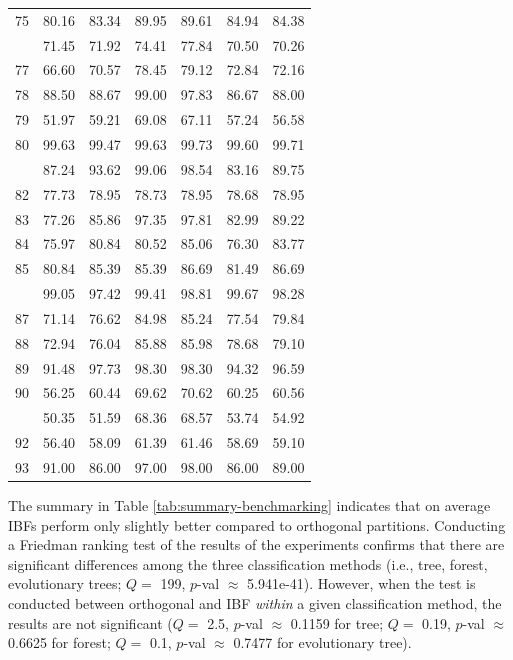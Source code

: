 \documentclass[]{elsarticle} %
\begin{document}
\begin{longtable}[t]{rrrrrrr}
75 & 80.16 & 83.34 & 89.95 & 89.61 & 84.94 & 84.38\\
\addlinespace
76 & 71.45 & 71.92 & 74.41 & 77.84 & 70.50 & 70.26\\
77 & 66.60 & 70.57 & 78.45 & 79.12 & 72.84 & 72.16\\
78 & 88.50 & 88.67 & 99.00 & 97.83 & 86.67 & 88.00\\
79 & 51.97 & 59.21 & 69.08 & 67.11 & 57.24 & 56.58\\
80 & 99.63 & 99.47 & 99.63 & 99.73 & 99.60 & 99.71\\
\addlinespace
81 & 87.24 & 93.62 & 99.06 & 98.54 & 83.16 & 89.75\\
82 & 77.73 & 78.95 & 78.73 & 78.95 & 78.68 & 78.95\\
83 & 77.26 & 85.86 & 97.35 & 97.81 & 82.99 & 89.22\\
84 & 75.97 & 80.84 & 80.52 & 85.06 & 76.30 & 83.77\\
85 & 80.84 & 85.39 & 85.39 & 86.69 & 81.49 & 86.69\\
\addlinespace
86 & 99.05 & 97.42 & 99.41 & 98.81 & 99.67 & 98.28\\
87 & 71.14 & 76.62 & 84.98 & 85.24 & 77.54 & 79.84\\
88 & 72.94 & 76.04 & 85.88 & 85.98 & 78.68 & 79.10\\
89 & 91.48 & 97.73 & 98.30 & 98.30 & 94.32 & 96.59\\
90 & 56.25 & 60.44 & 69.62 & 70.62 & 60.25 & 60.56\\
\addlinespace
91 & 50.35 & 51.59 & 68.36 & 68.57 & 53.74 & 54.92\\
92 & 56.40 & 58.09 & 61.39 & 61.46 & 58.69 & 59.10\\
93 & 91.00 & 86.00 & 97.00 & 98.00 & 86.00 & 89.00\\*
\end{longtable}

The summary in Table \ref{tab:summary-benchmarking} indicates that on
average IBFs perform only slightly better compared to orthogonal
partitions. Conducting a Friedman ranking test of the results of the
experiments confirms that there are significant differences among the
three classification methods (i.e., tree, forest, evolutionary trees;
\(Q =\) 199, \(p\)-val \(\approx\) 5.941e-41). However, when the test is
conducted between orthogonal and IBF \emph{within} a given
classification method, the results are not significant (\(Q =\) 2.5,
\(p\)-val \(\approx\) 0.1159 for tree; \(Q =\) 0.19, \(p\)-val
\(\approx\) 0.6625 for forest; \(Q =\) 0.1, \(p\)-val \(\approx\) 0.7477
for evolutionary tree).
\end{document}
